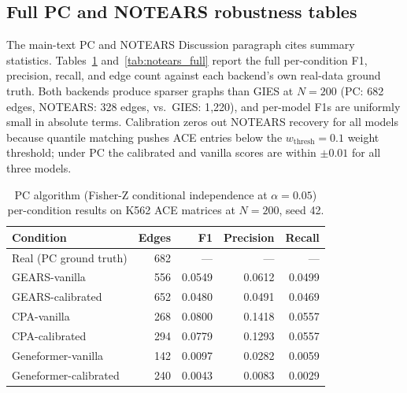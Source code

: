 \documentclass{article}
\theoremstyle{plain}
\theoremstyle{definition}
\theoremstyle{remark}
\begin{document}
\subsection{Full PC and NOTEARS robustness tables}
\label{app:pc_notears}

The main-text PC and NOTEARS Discussion paragraph cites summary statistics. Tables~\ref{tab:pc_full} and~\ref{tab:notears_full} report the full per-condition F1, precision, recall, and edge count against each backend's own real-data ground truth. Both backends produce sparser graphs than GIES at $N{=}200$ (PC: 682 edges, NOTEARS: 328 edges, vs.\ GIES: 1{,}220), and per-model F1s are uniformly small in absolute terms. Calibration zeros out NOTEARS recovery for all models because quantile matching pushes ACE entries below the $w_{\mathrm{thresh}}{=}0.1$ weight threshold; under PC the calibrated and vanilla scores are within $\pm 0.01$ for all three models.

\begin{table}[h]
\centering
\small
\begin{tabular}{lrrrr}
\toprule
\textbf{Condition} & \textbf{Edges} & \textbf{F1} & \textbf{Precision} & \textbf{Recall} \\
\midrule
Real (PC ground truth)   & 682 & --- & --- & --- \\
GEARS-vanilla            & 556 & 0.0549 & 0.0612 & 0.0499 \\
GEARS-calibrated         & 652 & 0.0480 & 0.0491 & 0.0469 \\
CPA-vanilla              & 268 & 0.0800 & 0.1418 & 0.0557 \\
CPA-calibrated           & 294 & 0.0779 & 0.1293 & 0.0557 \\
Geneformer-vanilla       & 142 & 0.0097 & 0.0282 & 0.0059 \\
Geneformer-calibrated    & 240 & 0.0043 & 0.0083 & 0.0029 \\
\bottomrule
\end{tabular}
\caption{PC algorithm (Fisher-Z conditional independence at $\alpha{=}0.05$) per-condition results on K562 ACE matrices at $N{=}200$, seed 42.}
\label{tab:pc_full}
\end{table}
\end{document}
